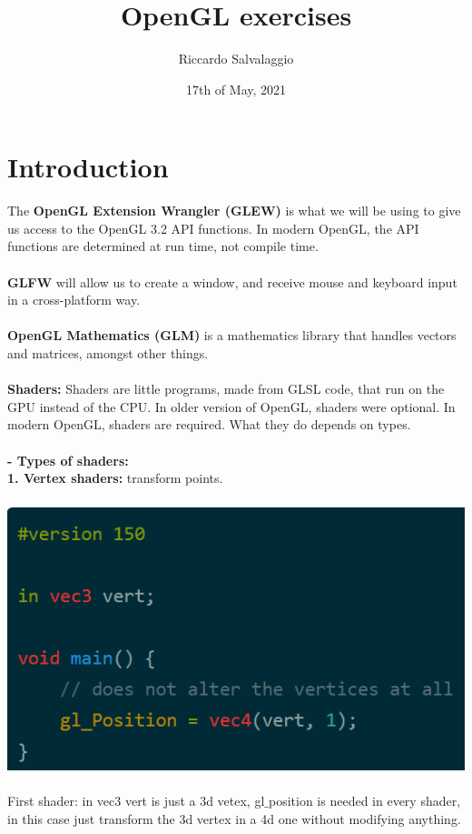 \documentclass{article}
\title{OpenGL exercises}
\author{Riccardo Salvalaggio}
\date{17th of May, 2021}
\begin{document}
\maketitle
\newpage
\tableofcontents
\newpage

\section{Introduction}
The \textbf{OpenGL Extension Wrangler (GLEW)} is what we will be using to give us access to the OpenGL 3.2 API functions.  In modern OpenGL, the API functions are determined at run time, not compile time.\\\\
\textbf{GLFW} will allow us to create a window, and receive mouse and keyboard input in a cross-platform way.\\\\
\textbf{OpenGL Mathematics (GLM)} is a mathematics library that handles vectors and matrices, amongst other things.\\\\
\textbf{Shaders: }Shaders are little programs, made from GLSL code, that run on the GPU instead of the CPU. In older version of OpenGL, shaders were optional. In modern OpenGL, shaders are required. What they do depends on types.\\\\
\textbf{- Types of shaders: }\\
\textbf{1. Vertex shaders: }transform points.\\\\
\includegraphics[scale=0.6]{1.png}\\\\
First shader: in vec3 vert is just a 3d vetex, gl$\_$position is needed in every shader, in this case just transform the 3d vertex in a 4d one without modifying anything.\\
\end{document}
